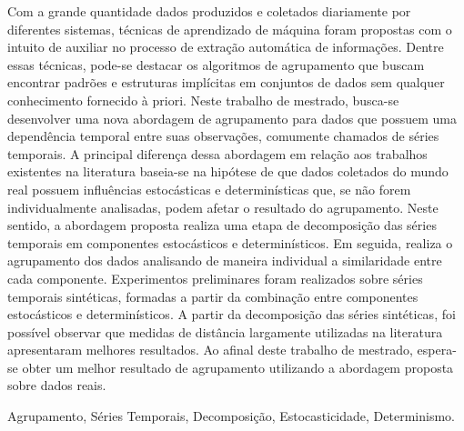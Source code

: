 \resumo

Com a grande quantidade dados produzidos e coletados diariamente por diferentes sistemas, técnicas de aprendizado de máquina foram propostas com o intuito de auxiliar no processo de extração automática de informações. Dentre essas técnicas, pode-se destacar os algoritmos de agrupamento que buscam encontrar padrões e estruturas implícitas em conjuntos de dados sem qualquer conhecimento fornecido à priori. Neste trabalho de mestrado, busca-se desenvolver uma nova abordagem de agrupamento para dados que possuem uma dependência temporal entre suas observações, comumente chamados de séries temporais. A principal diferença dessa abordagem em relação aos trabalhos existentes na literatura baseia-se na hipótese de que dados coletados do mundo real possuem influências estocásticas e determinísticas que, se não forem individualmente analisadas, podem afetar o resultado do agrupamento. Neste sentido, a abordagem proposta realiza uma etapa de decomposição das séries temporais em componentes estocásticos e determinísticos. Em seguida, realiza o agrupamento dos dados analisando de maneira individual a similaridade entre cada componente. Experimentos preliminares foram realizados sobre séries temporais sintéticas, formadas a partir da combinação entre componentes estocásticos e determinísticos. A partir da decomposição das séries sintéticas, foi possível observar que medidas de distância largamente utilizadas na literatura apresentaram melhores resultados. Ao afinal deste trabalho de mestrado, espera-se obter um melhor resultado de agrupamento utilizando a abordagem proposta sobre dados reais.

\begin{keywords}
Agrupamento, Séries Temporais, Decomposição, Estocasticidade, Determinismo. 
\end{keywords}
